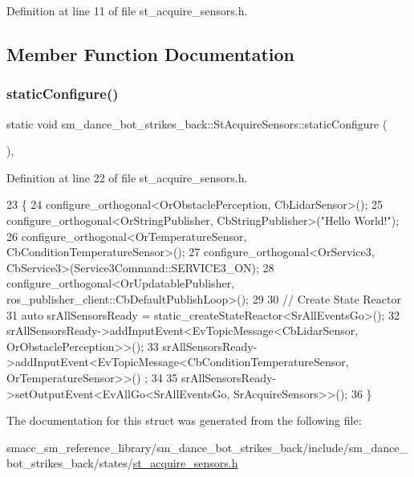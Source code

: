 Definition at line 11 of file st\+\_\+acquire\+\_\+sensors.\+h.



\subsection{Member Function Documentation}
\mbox{\label{structsm__dance__bot__strikes__back_1_1StAcquireSensors_a83de29e9c8ce05f82c487b91255f9fe1}} 
\subsubsection{\texorpdfstring{static\+Configure()}{staticConfigure()}}
{\footnotesize\ttfamily static void sm\+\_\+dance\+\_\+bot\+\_\+strikes\+\_\+back\+::\+St\+Acquire\+Sensors\+::static\+Configure (\begin{DoxyParamCaption}{ }\end{DoxyParamCaption})\hspace{0.3cm}{\ttfamily [inline]}, {\ttfamily [static]}}



Definition at line 22 of file st\+\_\+acquire\+\_\+sensors.\+h.


\begin{DoxyCode}
23    \{
24       configure\_orthogonal<OrObstaclePerception, CbLidarSensor>();
25       configure\_orthogonal<OrStringPublisher, CbStringPublisher>(\textcolor{stringliteral}{"Hello World!"});
26       configure\_orthogonal<OrTemperatureSensor, CbConditionTemperatureSensor>();
27       configure\_orthogonal<OrService3, CbService3>(Service3Command::SERVICE3\_ON);
28       configure\_orthogonal<OrUpdatablePublisher, ros\_publisher\_client::CbDefaultPublishLoop>();
29 
30       \textcolor{comment}{// Create State Reactor}
31       \textcolor{keyword}{auto} srAllSensorsReady = static\_createStateReactor<SrAllEventsGo>();
32       srAllSensorsReady->addInputEvent<EvTopicMessage<CbLidarSensor, OrObstaclePerception>>();
33       srAllSensorsReady->addInputEvent<EvTopicMessage<CbConditionTemperatureSensor, OrTemperatureSensor>>()
      ;
34 
35       srAllSensorsReady->setOutputEvent<EvAllGo<SrAllEventsGo, SrAcquireSensors>>();
36    \}
\end{DoxyCode}


The documentation for this struct was generated from the following file\+:\begin{DoxyCompactItemize}
\item 
smacc\+\_\+sm\+\_\+reference\+\_\+library/sm\+\_\+dance\+\_\+bot\+\_\+strikes\+\_\+back/include/sm\+\_\+dance\+\_\+bot\+\_\+strikes\+\_\+back/states/\hyperlink{strikes__back_2include_2sm__dance__bot__strikes__back_2states_2st__acquire__sensors_8h}{st\+\_\+acquire\+\_\+sensors.\+h}\end{DoxyCompactItemize}
